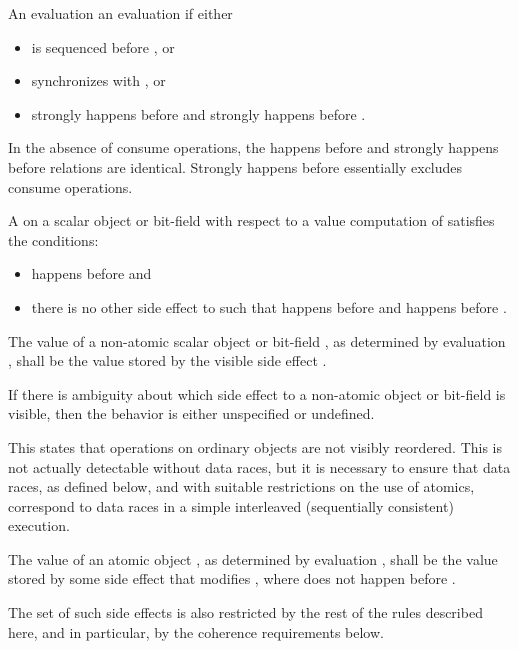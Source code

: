 \pnum
An evaluation   an evaluation 
if either
\begin{itemize}
\item {} is sequenced before , or
\item {} synchronizes with , or
\item {} strongly happens before  and  strongly happens before .
\end{itemize}
\begin{note}
In the absence of consume operations,
the happens before and strongly happens before relations are identical.
Strongly happens before essentially excludes consume operations.
\end{note}

\pnum
A   on a scalar object or bit-field 
with respect to a value computation  of  satisfies the
conditions:
\begin{itemize}
\item {} happens before  and
\item there is no other
%
side effect  to  such that 
happens before  and  happens before .
\end{itemize}

The value of a non-atomic scalar object or bit-field , as determined by
evaluation , shall be the value stored by the
%
visible side effect
. \begin{note} If there is ambiguity about which side effect to a
non-atomic object or bit-field is visible, then the behavior is either
unspecified or undefined. \end{note} \begin{note} This states that operations on
ordinary objects are not visibly reordered. This is not actually detectable
without data races, but it is necessary to ensure that data races, as defined
below, and with suitable restrictions on the use of atomics, correspond to data
races in a simple interleaved (sequentially consistent) execution. \end{note}

\pnum
The value of an
atomic object , as determined by evaluation , shall be the value
stored by some
side effect  that modifies , where  does not happen
before .
\begin{note}
The set of such side effects is also restricted by the rest of the rules
described here, and in particular, by the coherence requirements below.
\end{note}

